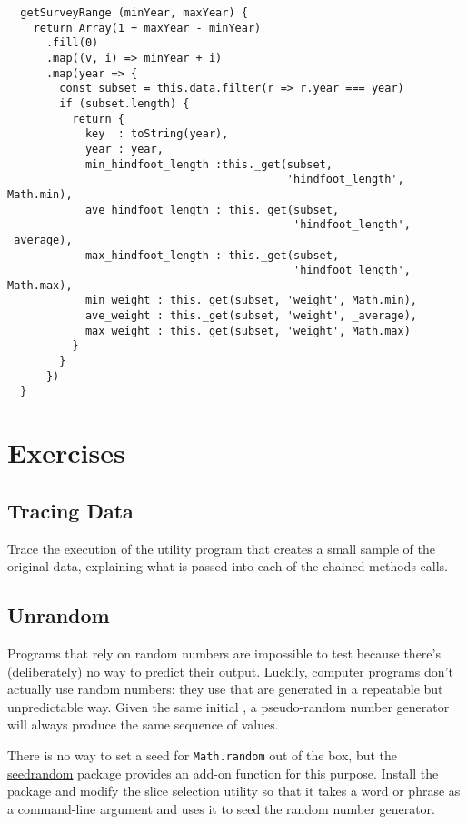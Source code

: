 \begin{verbatim}
  getSurveyRange (minYear, maxYear) {
    return Array(1 + maxYear - minYear)
      .fill(0)
      .map((v, i) => minYear + i)
      .map(year => {
        const subset = this.data.filter(r => r.year === year)
        if (subset.length) {
          return {
            key  : toString(year),
            year : year,
            min_hindfoot_length :this._get(subset,
                                           'hindfoot_length', Math.min),
            ave_hindfoot_length : this._get(subset,
                                            'hindfoot_length', _average),
            max_hindfoot_length : this._get(subset,
                                            'hindfoot_length', Math.max),
            min_weight : this._get(subset, 'weight', Math.min),
            ave_weight : this._get(subset, 'weight', _average),
            max_weight : this._get(subset, 'weight', Math.max)
          }
        }
      })
  }
\end{verbatim}

\section{Exercises}\label{s:dataman-exercises}

\subsection*{Tracing Data}
Trace the execution of the utility program that creates a small sample of the original data,
explaining what is passed into each of the chained methods calls.

\subsection*{Unrandom}
Programs that rely on random numbers are impossible to test
because there's (deliberately) no way to predict their output.
Luckily, computer programs don't actually use random numbers:
they use 
that are generated in a repeatable but unpredictable way.
Given the same initial ,
a pseudo-random number generator will always produce the same sequence of values.

There is no way to set a seed for \texttt{Math.random} out of the box,
but the \href{https://www.npmjs.com/package/seedrandom}{seedrandom} package provides an add-on function for this purpose.
Install the package and modify the slice selection utility
so that it takes a word or phrase as a command-line argument
and uses it to seed the random number generator.


